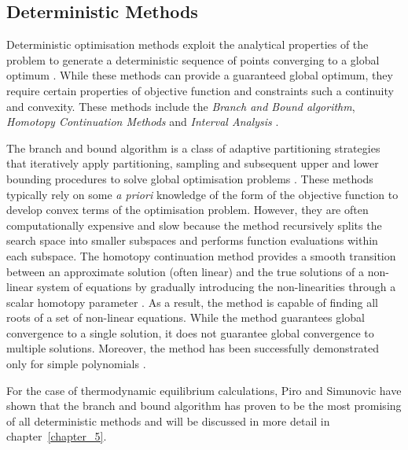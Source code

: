 	\subsection{Deterministic Methods}
	Deterministic optimisation methods exploit the analytical properties of the problem to generate a deterministic sequence of points converging to a global optimum \cite{PARDALOS2000209}. While these methods can provide a guaranteed global optimum, they require certain properties of objective function and constraints such a continuity and convexity. These methods include the \emph{Branch and Bound algorithm}, \emph{Homotopy Continuation Methods}  and \emph{Interval Analysis} \cite{Floudas99}. 
	
	The branch and bound algorithm is a class of adaptive partitioning strategies that iteratively apply partitioning, sampling and subsequent upper and lower bounding procedures to solve global optimisation problems \cite{Floudas99}.  These methods typically rely on some \textit{a priori} knowledge of the form of the objective function to  develop convex terms of the optimisation problem. However, they are often computationally expensive and slow \cite{Wakeham04,Nichita02} because the method recursively splits the search space into smaller subspaces and performs function evaluations within each subspace. The homotopy continuation method provides a smooth transition between an approximate solution (often linear) and the true solutions of a non-linear system of equations by gradually introducing the non-linearities through a scalar homotopy parameter \cite{B.-Riggs:1994aa,JALALI20082333}. As a result, the method is capable of finding all roots of a set of non-linear equations. While the method guarantees global convergence to a single solution, it does not guarantee global convergence to multiple solutions. Moreover, the method has been successfully demonstrated only for simple polynomials \cite{Zhang11}. 
	
	For the case of thermodynamic equilibrium calculations, Piro and Simunovic \cite{Piro16} have shown that the branch and bound algorithm has proven to be the most promising of all deterministic methods and will be discussed in more detail in chapter~\ref{chapter_5}.

